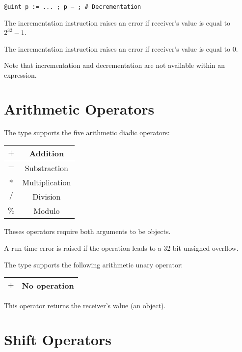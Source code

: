 \texttt{@uint p := ... ; p -- ; \# Decrementation}\newline

The incrementation instruction raises an error if receiver's value is equal to $2^{32}-1$.\newline

The incrementation instruction raises an error if receiver's value is equal to 0.\newline

Note that incrementation and decrementation are not available within an expression.




\section{Arithmetic Operators}

The  type supports the five arithmetic diadic operators:\newline

\begin{tabular}{|c|c|}
\hline
$+$ & Addition \\
\hline
$-$ & Substraction \\
\hline
$*$ & Multiplication \\
\hline
$/$ & Division \\
\hline
$\%$ & Modulo \\
\hline
\end{tabular}

Theses operators require both arguments to be  objects.\newline

A run-time error is raised if the operation leads to a 32-bit unsigned overflow.

The  type supports the following arithmetic unary operator:\newline

\begin{tabular}{|c|c|}
\hline
$+$ & No operation \\
\hline
\end{tabular}

This operator returns the receiver's value (an   object).






\section{Shift Operators}


